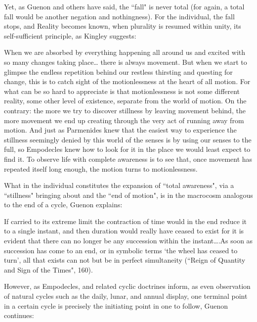 Yet, as Guenon and others have said, the ``fall" is never total (for again, a total fall would be another negation and nothingness). For the individual, the fall stops, and Reality becomes known, when plurality is resumed within unity, its self-sufficient principle, as Kingley suggests:

\begin{quotex}
When we are absorbed by everything happening all around us and excited with so many changes taking place… there is always movement. But when we start to glimpse the endless repetition behind our restless thirsting and questing for change, this is to catch sight of the motionlessness at the heart of all motion. For what can be so hard to appreciate is that motionlessness is not some different reality, some other level of existence, separate from the world of motion. On the contrary: the more we try to discover stillness by leaving movement behind, the more movement we end up creating through the very act of running away from motion. And just as Parmenides knew that the easiest way to experience the stillness seemingly denied by this world of the senses is by using our senses to the full, so Empodecles knew how to look for it in the place we would least expect to find it. To observe life with complete awareness is to see that, once movement has repeated itself long enough, the motion turns to motionlessness. 

\end{quotex}
What in the individual constitutes the expansion of ``total awareness", via a ``stillness" bringing about and the ``end of motion", is in the macrocosm analogous to the end of a cycle, Guenon explains:

\begin{quotex}
If carried to its extreme limit the contraction of time would in the end reduce it to a single instant, and then duration would really have ceased to exist for it is evident that there can no longer be any succession within the instant….As soon as succession has come to an end, or in symbolic terms `the wheel has ceased to turn', all that exists can not but be in perfect simultaneity (``Reign of Quantity and Sign of the Times", 160).

\end{quotex}
However, as Empodecles, and related cyclic doctrines inform, as even observation of natural cycles such as the daily, lunar, and annual display, one terminal point in a certain cycle is precisely the initiating point in one to follow, Guenon continues:

